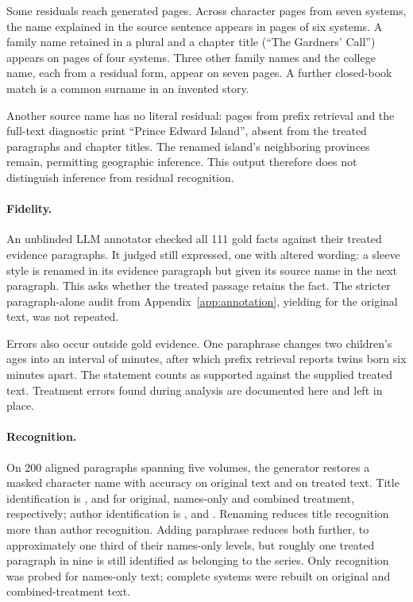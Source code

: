 Some residuals reach generated pages. Across  character pages
from seven systems, the name explained in the source sentence appears in
 pages of six systems. A family name retained in a plural
and a chapter title (``The Gardners' Call'') appears on
 pages of four systems. Three other family names and the
college name, each from a residual form, appear on seven pages. A further
closed-book match is a common surname in an invented story.

Another source name has no literal residual:  pages from prefix
retrieval and the full-text diagnostic print ``Prince Edward Island'', absent from
the treated paragraphs and chapter titles. The renamed island's neighboring provinces
remain, permitting geographic inference. This output therefore does not distinguish
inference from residual recognition.

\paragraph{Fidelity.}
An unblinded LLM annotator checked all 111 gold facts against their treated evidence
paragraphs. It judged  still expressed, one with altered wording:
a sleeve style is renamed in its evidence paragraph but given its source name in
the next paragraph. This asks whether the treated passage retains the fact.
The stricter paragraph-alone audit from Appendix~\ref{app:annotation}, yielding
 for the original text, was not repeated.

Errors also occur outside gold evidence. One paraphrase changes two children's ages
into an interval of minutes, after which prefix retrieval reports twins born six
minutes apart. The statement counts as supported against the supplied treated text.
Treatment errors found during analysis are documented here and left in place.

\paragraph{Recognition.}
On 200 aligned paragraphs spanning five volumes, the generator restores a masked
character name with accuracy  on original text and
 on treated text. Title identification is
,  and 
for original, names-only and combined treatment, respectively; author identification
is ,  and .
Renaming reduces title recognition more than author recognition. Adding paraphrase
reduces both further, to approximately one third of their names-only levels, but
roughly one treated paragraph in nine is still identified as belonging to the series.
Only recognition was probed for names-only text; complete systems were rebuilt on
original and combined-treatment text.

